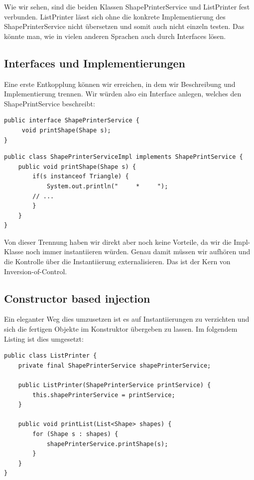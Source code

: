 Wie wir sehen, sind die beiden Klassen ShapePrinterService und ListPrinter fest
verbunden. ListPrinter lässt sich ohne die konkrete Implementierung des
ShapePrinterService nicht übersetzen und somit auch nicht einzeln testen.
Das könnte man, wie in vielen anderen Sprachen auch durch Interfaces lösen.
\subsection{Interfaces und Implementierungen}
Eine erste Entkopplung können wir erreichen, in dem wir Beschreibung und 
Implementierung trennen. Wir würden also ein Interface anlegen, welches den
ShapePrintService beschreibt:

\begin{listing}[H]
\begin{verbatim}
public interface ShapePrinterService {
     void printShape(Shape s);
}
\end{verbatim}
\caption{Interface of ShapePrinterServer}
\label{lst:shapePrintImple}
\end{listing}

\begin{listing}[H]
\begin{verbatim}
public class ShapePrinterServiceImpl implements ShapePrintService {
    public void printShape(Shape s) {
        if(s instanceof Triangle) {
            System.out.println("     *     ");
        // ...
        }
    }
}
\end{verbatim}
\caption{Implementation of ShapePrinterServer in Java-Pseudocode}
\label{lst:shapePrintImpel}
\end{listing}

Von dieser Trennung haben wir direkt aber noch keine Vorteile, da wir
die Impl-Klasse noch immer instantiieren würden. Genau damit müssen wir
aufhören und die Kontrolle über die Instantiierung externalisieren. Das ist
der Kern von Inversion-of-Control.

\subsection{Constructor based injection}
Ein eleganter Weg dies umzusetzen ist es auf Instantiierungen zu verzichten
und sich die fertigen Objekte im Konstruktor übergeben zu lassen. Im
folgendem Listing ist dies umgesetzt:

\begin{listing}[H]
\begin{verbatim}
public class ListPrinter {
    private final ShapePrinterService shapePrinterService;

    public ListPrinter(ShapePrinterService printService) {
        this.shapePrinterService = printService;
    }

    public void printList(List<Shape> shapes) {
        for (Shape s : shapes) {
            shapePrinterService.printShape(s);
        }
    }
}
\end{verbatim}
\caption{Constructor Based Injection}
\label{lst:constructorInjection}
\end{listing}

